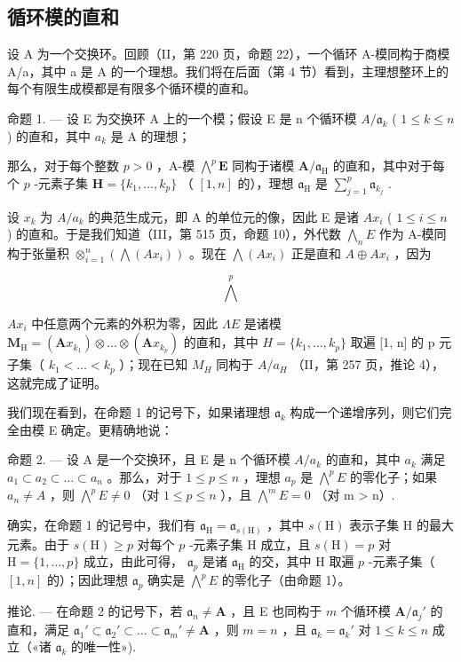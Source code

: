 \subsection{循环模的直和}

设 A 为一个交换环。回顾（II，第 220 页，命题 22），一个循环 A-模同构于商模 A/a，其中 a 是 A 的一个理想。我们将在后面（第 4 节）看到，主理想整环上的每个有限生成模都是有限多个循环模的直和。

命题 1. --- 设 E 为交换环 A 上的一个模；假设 E 是 n 个循环模 \(A/\mathfrak{a}_{k}\) ( \(1 \leqslant k \leqslant n\) ) 的直和，其中 \(a_{k}\) 是 A 的理想；

那么，对于每个整数 \(p > 0\) ，A-模 \(\bigwedge^p \mathbf{E}\) 同构于诸模 \(\mathbf{A} / \mathfrak{a}_{\mathrm{H}}\) 的直和，其中对于每个 \(p\) -元素子集 \(\mathbf{H} = \{k_1, \dots, k_p\}\) （ \([1, n]\) 的），理想 \(\mathfrak{a}_{\mathrm{H}}\) 是 \(\sum_{j=1}^{p} \mathfrak{a}_{k_j}\) .

设 \(x_{k}\) 为 \(A / a_{k}\) 的典范生成元，即 A 的单位元的像，因此 E 是诸 \(Ax_{i}\) ( \(1 \leqslant i \leqslant n\) ) 的直和。于是我们知道（III，第 515 页，命题 10），外代数 \(\bigwedge_{n} E\) 作为 A-模同构于张量积 \(\otimes_{i=1}^{n} (\bigwedge(Ax_{i}))\) 。现在 \(\bigwedge(Ax_{i})\) 正是直和 \(A \oplus Ax_{i}\) ，因为

\[
\bigwedge^ {p}
\]

\(Ax_{i}\) 中任意两个元素的外积为零，因此 \(\Lambda E\) 是诸模 \(\mathbf{M}_{\mathrm{H}} = (\mathbf{A}x_{k_{1}}) \otimes \ldots \otimes (\mathbf{A}x_{k_{p}})\) 的直和，其中 \(H = \{k_{1}, \ldots, k_{p}\}\) 取遍 {[}1, n{]} 的 p 元子集（ \(k_{1} < \ldots < k_{p}\) ）；现在已知 \(M_{H}\) 同构于 \(A/a_{H}\) （II，第 257 页，推论 4），这就完成了证明。

我们现在看到，在命题 1 的记号下，如果诸理想 \(\mathfrak{a}_k\) 构成一个递增序列，则它们完全由模 E 确定。更精确地说：

命题 2. --- 设 A 是一个交换环，且 E 是 n 个循环模 \(A/a_{k}\) 的直和，其中 \(a_{k}\) 满足 \(a_{1} \subset a_{2} \subset \ldots \subset a_{n}\) 。那么，对于 \(1 \leqslant p \leqslant n\) ，理想 \(a_{p}\) 是 \(\bigwedge^{p} E\) 的零化子；如果 \(a_{n} \neq A\) ，则 \(\bigwedge^{p} E \neq 0\) （对 \(1 \leqslant p \leqslant n\) ），且 \(\bigwedge^{m} E = 0\) （对 m \textgreater{} n）.

确实，在命题 1 的记号中，我们有 \(\mathfrak{a}_{\mathrm{H}} = \mathfrak{a}_{s(\mathrm{H})}\) ，其中 \(s(\mathrm{H})\) 表示子集 H 的最大元素。由于 \(s(\mathrm{H}) \geqslant p\) 对每个 \(p\) -元素子集 H 成立，且 \(s(\mathrm{H}) = p\) 对 \(\mathrm{H} = \{1, \dots, p\}\) 成立，由此可得， \(\mathfrak{a}_p\) 是诸 \(\mathfrak{a}_{\mathrm{H}}\) 的交，其中 H 取遍 \(p\) -元素子集（ \([1, n]\) 的）；因此理想 \(\mathfrak{a}_p\) 确实是 \(\bigwedge^p E\) 的零化子（由命题 1）。

推论. --- 在命题 2 的记号下，若 \(\mathfrak{a}_n \neq \mathbf{A}\) ，且 E 也同构于 \(m\) 个循环模 \(\mathbf{A} / \mathfrak{a}_j'\) 的直和，满足 \(\mathfrak{a}_1' \subset \mathfrak{a}_2' \subset \ldots \subset \mathfrak{a}_m' \neq \mathbf{A}\) ，则 \(m = n\) ，且 \(\mathfrak{a}_k = \mathfrak{a}_k'\) 对 \(1 \leqslant k \leqslant n\) 成立（«诸 \(\mathfrak{a}_k\) 的唯一性»).
